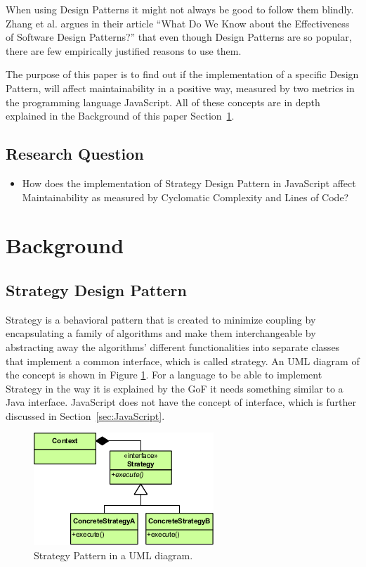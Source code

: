 \documentclass[conference, a4paper]{IEEEtran}
\begin{document}
When using Design Patterns it might not always be good to follow them blindly. Zhang et al. argues in their article ``What Do We Know about the Effectiveness of Software Design Patterns?'' that even though Design Patterns are so popular, there are few empirically justified reasons to use them.~\cite{bibitem:Zhang}

The purpose of this paper is to find out if the implementation of a specific Design Pattern, will affect maintainability in a positive way, measured by two metrics in the programming language JavaScript. All of these concepts are in depth explained in the Background of this paper Section~\ref{sec:Background}.

\subsection{Research Question}
\begin{itemize}
	\item How does the implementation of Strategy Design Pattern in JavaScript affect Maintainability as measured by Cyclomatic Complexity and Lines of Code?
\end{itemize}

\section{Background}
\label{sec:Background}

\subsection{Strategy Design Pattern}
\label{sec:Strategy}

Strategy is a behavioral pattern that is created to minimize coupling by encapsulating a family of algorithms and make them interchangeable by abstracting away the algorithms' different functionalities into separate classes that implement a common interface, which is called strategy. An UML diagram of the concept is shown in Figure \ref{fig:Strategy}. For a language to be able to implement Strategy in the way it is explained by the GoF it needs something similar to a Java interface. JavaScript does not have the concept of interface, which is further discussed in Section~\ref{sec:JavaScript}.~\cite{bibitem:GoF}

\begin{figure}[ht!]
	\centering
	\includegraphics[scale=0.7]{Strategy_Pattern_in_UML.png}
	\caption{Strategy Pattern in a UML diagram.}
	\label{fig:Strategy}
\end{figure}
\end{document}
